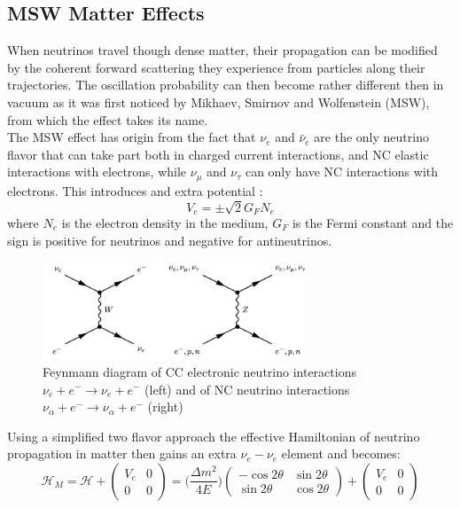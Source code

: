 \documentclass[12pt,a4paper,openright,twoside]{report}
\begin{document}
\subsection{MSW Matter Effects}
When neutrinos travel though dense matter, their propagation can be modified by the coherent forward scattering they experience from particles along their trajectories. The oscillation probability can then become rather different then in vacuum as it was first noticed by Mikhaev, Smirnov and Wolfenstein (MSW), from which the effect takes its name. \\
The MSW effect has origin from the fact that $\nu_e$ and $\bar{\nu}_e$ are the only neutrino flavor that can take part both in charged current interactions, and NC elastic interactions with electrons, while $\nu_\mu$ and $\nu_\tau$ can only have NC interactions with electrons. This introduces and extra potential :
\begin{equation}
V_e= \pm \sqrt{2} G_FN_e
\end{equation} 
where $N_e$ is the electron density in the medium, $G_F$ is the Fermi constant and the sign is positive for neutrinos and negative for antineutrinos.\\
\begin{figure}
	\centering
	\includegraphics[width=0.7\textwidth]{WZ.png}
	\caption{\label{WZ:fig} Feynmann diagram of CC electronic neutrino interactions $\nu_e+e^- \rightarrow \nu_e+e^-$ (left) and of NC neutrino interactions $\nu_\alpha+e^- \rightarrow \nu_\alpha+e^-$ (right) }
\end{figure}
Using a simplified two flavor approach the effective Hamiltonian of neutrino propagation in matter then gains an extra $\nu_e-\nu_e$ element and becomes:
\begin{equation}
\mathcal{H}_M= 
\mathcal{H}+
\begin{pmatrix}
V_e & 0 \\
0 & 0
\end{pmatrix}
=
\bigg(\frac{\Delta m^2}{4E}\bigg)
\begin{pmatrix}
-\cos 2\theta & \sin 2\theta \\
\sin 2 \theta & \cos 2 \theta
\end{pmatrix}
+
\begin{pmatrix}
V_e & 0 \\
0 & 0
\end{pmatrix}
\end{equation}
\end{document}
